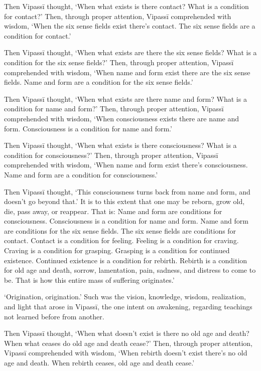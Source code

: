 \documentclass[12pt,openany]{book}%
\begin{document}
Then \textsanskrit{Vipassī} thought, ‘When what exists is there contact? What is a condition for contact?’ Then, through proper attention, \textsanskrit{Vipassī} comprehended with wisdom, ‘When the six sense fields exist there’s contact. The six sense fields are a condition for contact.’ 

Then \textsanskrit{Vipassī} thought, ‘When what exists are there the six sense fields? What is a condition for the six sense fields?’ Then, through proper attention, \textsanskrit{Vipassī} comprehended with wisdom, ‘When name and form exist there are the six sense fields. Name and form are a condition for the six sense fields.’ 

Then \textsanskrit{Vipassī} thought, ‘When what exists are there name and form? What is a condition for name and form?’ Then, through proper attention, \textsanskrit{Vipassī} comprehended with wisdom, ‘When consciousness exists there are name and form. Consciousness is a condition for name and form.’ 

Then \textsanskrit{Vipassī} thought, ‘When what exists is there consciousness? What is a condition for consciousness?’ Then, through proper attention, \textsanskrit{Vipassī} comprehended with wisdom, ‘When name and form exist there’s consciousness. Name and form are a condition for consciousness.’ 

Then \textsanskrit{Vipassī} thought, ‘This consciousness turns back from name and form, and doesn’t go beyond that.’ It is to this extent that one may be reborn, grow old, die, pass away, or reappear. That is: Name and form are conditions for consciousness. Consciousness is a condition for name and form. Name and form are conditions for the six sense fields. The six sense fields are conditions for contact. Contact is a condition for feeling. Feeling is a condition for craving. Craving is a condition for grasping. Grasping is a condition for continued existence. Continued existence is a condition for rebirth. Rebirth is a condition for old age and death, sorrow, lamentation, pain, sadness, and distress to come to be. That is how this entire mass of suffering originates.’ 

‘Origination, origination.’ Such was the vision, knowledge, wisdom, realization, and light that arose in \textsanskrit{Vipassī}, the one intent on awakening, regarding teachings not learned before from another. 

Then \textsanskrit{Vipassī} thought, ‘When what doesn’t exist is there no old age and death? When what ceases do old age and death cease?’ Then, through proper attention, \textsanskrit{Vipassī} comprehended with wisdom, ‘When rebirth doesn’t exist there’s no old age and death. When rebirth ceases, old age and death cease.’ 
\end{document}
